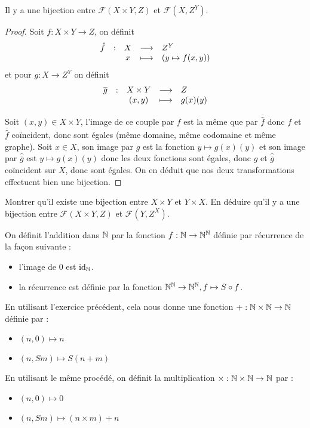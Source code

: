 \begin{lem}[Curryfication]
    Il y a une bijection entre $\mathcal F(X\times Y,Z)$ et $\mathcal F(X,Z^Y)$.
\end{lem}

\begin{proof}
    Soit $f : X\times Y \to Z$, on définit $$\begin{array}{rcccl} \hat f & : & X &\longrightarrow & Z^Y\\ & &x & \longmapsto & (y\mapsto f(x,y))\end{array}$$ et pour $g : X \to Z^Y$ on définit $$\begin{array}{rcccl} \overline g & : & X\times Y &\longrightarrow & Z\\ & &(x,y) & \longmapsto & g(x)(y)\end{array}$$

    Soit $(x,y)\in X\times Y$, l'image de ce couple par $f$ est la même que par $\overline{\hat f}$ donc $f$ et $\overline{\hat f}$ coïncident, donc sont égales (même domaine, même codomaine et même graphe). Soit $x\in X$, son image par $g$ est la fonction $y\mapsto g(x)(y)$ et son image par $\hat{\overline g}$ est $y\mapsto g(x)(y)$ donc les deux fonctions sont égales, donc $g$ et $\hat{\overline g}$ coïncident sur $X$, donc sont égales. On en déduit que nos deux transformations effectuent bien une bijection.
\end{proof}

\begin{exo}
    Montrer qu'il existe une bijection entre $X\times Y$ et $Y\times X$. En déduire qu'il y a une bijection entre $\mathcal F(X\times Y,Z)$ et $\mathcal F(Y,Z^X)$.
\end{exo}

\begin{defi}[Addition]
    On définit l'addition dans $\mathbb{N}$ par la fonction $f : \mathbb{N}\to\mathbb{N}^{\mathbb{N}}$ définie par récurrence de la façon suivante : 
    \begin{itemize}[label=$\bullet$]
        \item l'image de $0$ est $\mathrm{id}_{\mathbb{N}}$.
        \item la récurrence est définie par la fonction $\mathbb{N}^{\mathbb{N}}\to\mathbb{N}^{\mathbb{N}}, f \mapsto S\circ f$.
    \end{itemize}

    En utilisant l'exercice précédent, cela nous donne une fonction $+ : \mathbb{N}\times \mathbb{N} \to \mathbb{N}$ définie par :
    \begin{itemize}[label=$\bullet$]
        \item $(n,0)\mapsto n$
        \item $(n,Sm)\mapsto S(n + m)$
    \end{itemize}
\end{defi}

\begin{defi}[Multiplication]
    En utilisant le même procédé, on définit la multiplication $\times : \mathbb{N}\times\mathbb{N}\to\mathbb{N}$ par :
    \begin{itemize}[label=$\bullet$]
        \item $(n,0)\mapsto 0$
        \item $(n,Sm)\mapsto (n\times m)+n$
    \end{itemize}
\end{defi}

